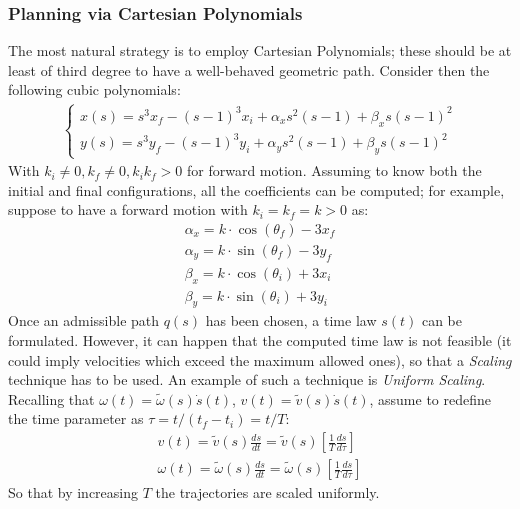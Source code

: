 \subsubsection{Planning via Cartesian Polynomials}
The most natural strategy is to employ Cartesian Polynomials; these should be at least of third degree to have a well-behaved geometric path. Consider then the following cubic polynomials:
\begin{gather*}
    \begin{cases}
        x(s)=s^3x_f-(s-1)^3x_i+\alpha_xs^2(s-1)+\beta_xs(s-1)^2 \\
        y(s)=s^3y_f-(s-1)^3y_i+\alpha_ys^2(s-1)+\beta_ys(s-1)^2
    \end{cases}
\end{gather*}
With $k_i\neq0,k_f\neq0,k_{i}k_{f}>0$ for forward motion. Assuming to know both the initial and final configurations, all the coefficients can be computed; for example, suppose to have a forward motion with $k_i=k_f=k>0$ as:
\begin{gather*}
    \alpha_x=k\cdot \cos(\theta_f)-3x_f \\
    \alpha_y=k\cdot \sin(\theta_f)-3y_f \\
    \beta_x=k\cdot \cos(\theta_i)+3x_i \\
    \beta_y=k\cdot \sin(\theta_i)+3y_i
\end{gather*}
Once an admissible path $q(s)$ has been chosen, a time law $s(t)$ can be formulated. However, it can happen that the computed time law is not feasible (it could imply velocities which exceed the maximum allowed ones), so that a \textit{Scaling} technique has to be used. An example of such a technique is \textit{Uniform Scaling}. Recalling that $\omega(t)=\tilde{\omega}(s)\dot{s}(t)$, $v(t)=\tilde{v}(s)\dot{s}(t)$, assume to redefine the time parameter as $\tau=t/(t_f-t_i)=t/T$:
\begin{gather*}
    v(t)=\tilde{v}(s)\frac{ds}{dt}=\tilde{v}(s)\left[\frac{1}{T}\frac{ds}{d\tau}\right] \\
    \omega(t)=\tilde{\omega}(s)\frac{ds}{dt}=\tilde{\omega}(s)\left[\frac{1}{T}\frac{ds}{d\tau}\right]
\end{gather*}
So that by increasing $T$ the trajectories are scaled uniformly.
